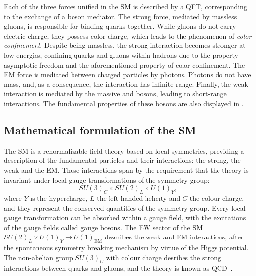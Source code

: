 Each of the three forces unified in the \ac{SM} is described by a \ac{QFT}, corresponding to the exchange of a boson mediator.
The strong force, mediated by massless gluons, is responsible for binding quarks together. While gluons do not carry electric charge, they possess color charge, which leads to the phenomenon of \textit{color confinement}. Despite being massless, the strong interaction becomes stronger at low energies, confining quarks and gluons within hadrons due to the property asymptotic freedom and the aforementioned property of color confinement.
The \ac{EM} force is mediated between charged particles by photons. Photons do not have mass, and, as a consequence, the interaction has infinite range.
Finally, the weak interaction is mediated by the massive \Wboson and \Zboson bosons, leading to short-range interactions. The fundamental properties of these bosons are also displayed in \Fig{\ref{fig:theory:sm:particles_interaction:particles}}.









\subsection{Mathematical formulation of the \ac{SM}}
\label{subsec:theory:sm:mathematical}

The \ac{SM} is a renormalizable field theory based on local symmetries, providing a description of the fundamental particles and their interactions: the strong, the weak and the \ac{EM}. These interactions span by the requirement that the theory is invariant under local gauge transformations of the symmetry group:
\begin{equation*}
    SU(3)_{C} \times SU(2)_{L} \times U(1)_{Y},
\end{equation*}
where \(Y\) is the hypercharge, \(L\) the left-handed helicity and \(C\) the colour charge, and they represent the conserved quantities of the symmetry group. Every local gauge transformation can be absorbed within a gauge field, with the excitations of the gauge fields called gauge bosons. The \ac{EW} sector of the \ac{SM} \(SU(2)_{L} \times U(1)_{Y} \to U(1)_{\text{EM}}\) describes the weak and \ac{EM} interactions, after the spontaneous symmetry breaking mechanism by virtue of the Higgs potential. The non-abelian group \(SU(3)_C\) with colour charge desribes the strong interactions between quarks and gluons, and the theory is known as \ac{QCD}~\cite{Ellis-1996-book}.

